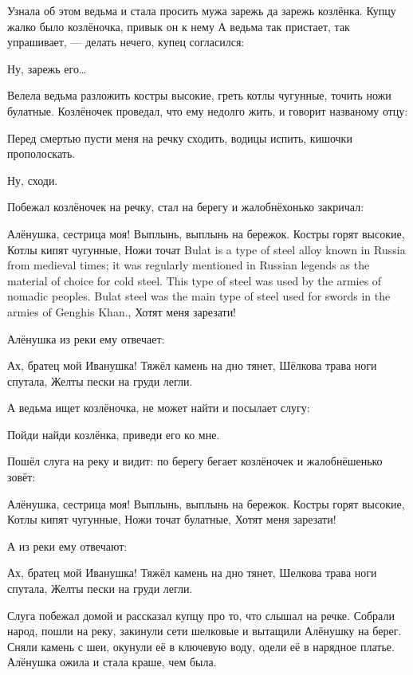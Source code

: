 Узнала об этом ведьма и стала просить мужа зарежь да зарежь козлёнка.
Купцу жалко было козлёночка, привык он к нему А ведьма так пристает, так упрашивает, --- делать нечего, купец согласился:
%
\begin{dialogue}
    \item Ну, зарежь его\dots
\end{dialogue}
%
Велела ведьма разложить костры высокие, греть котлы чугунные, точить ножи булатные.
Козлёночек проведал, что ему недолго жить, и говорит названому отцу:
%
\begin{dialogue}
    \item Перед смертью пусти меня на речку сходить, водицы испить, кишочки прополоскать.
    \item Ну, сходи.
\end{dialogue}
%
Побежал козлёночек на речку, стал на берегу и жалобнёхонько закричал:
%
\begin{dialogue}
    \item   Алёнушка, сестрица моя! Выплынь, выплынь на бережок.
    Костры горят высокие,
    Котлы кипят чугунные,
    Ножи точат  {Bulat is a type of steel alloy known in Russia from medieval times; it was regularly mentioned in Russian legends as the material of choice for cold steel. This type of steel was used by the armies of nomadic peoples. Bulat steel was the main type of steel used for swords in the armies of Genghis Khan.},
    Хотят меня зарезати!
\end{dialogue}
%
%
Алёнушка из реки ему отвечает:
%
\begin{dialogue}
    \item Ах, братец мой Иванушка! Тяжёл камень на дно тянет,
    Шёлкова трава ноги спутала,
    Желты пески на груди легли.
\end{dialogue}
%
%
А ведьма ищет козлёночка, не может найти и посылает слугу:
\begin{dialogue}
    \item Пойди найди козлёнка, приведи его ко мне.
\end{dialogue}
% 
%
Пошёл слуга на реку и видит: по берегу бегает козлёночек и жалобнёшенько зовёт:
\begin{dialogue}
    \item Алёнушка, сестрица моя! Выплынь, выплынь на бережок.
    Костры горят высокие,
    Котлы кипят чугунные,
    Ножи точат булатные,
    Хотят меня зарезати!
\end{dialogue}
%
%
А из реки ему отвечают:
\begin{dialogue}
    \item Ах, братец мой Иванушка!
    Тяжёл камень на дно тянет,
    Шелкова трава ноги спутала,
    Желты пески на груди легли.
\end{dialogue}
%
Слуга побежал домой и рассказал купцу про то, что слышал на речке. Собрали народ, пошли на реку, закинули сети шелковые и вытащили Алёнушку на берег. Сняли камень с шеи, окунули её в ключевую воду, одели её в нарядное платье. Алёнушка ожила и стала краше, чем была.

